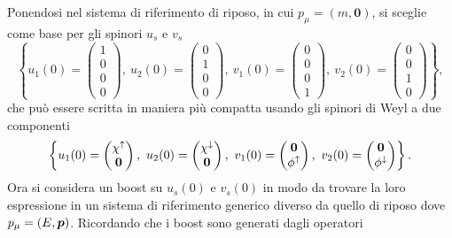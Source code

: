 Ponendosi nel sistema di riferimento di riposo, in cui $p_\mu = (m,\bm{0})$, si sceglie come base per gli spinori $u_s$ e $v_s$ 
\begin{equation}
    \left\{u_1(0) = 
    \begin{pmatrix}
        1 \\
        0 \\
        0 \\
        0
    \end{pmatrix},\
    u_2(0) = 
    \begin{pmatrix}
        0 \\
        1 \\
        0 \\
        0
    \end{pmatrix},\
    v_1(0) = 
    \begin{pmatrix}
        0 \\
        0 \\
        0 \\
        1
    \end{pmatrix},\
    v_2(0) = 
    \begin{pmatrix}
        0 \\
        0 \\
        1 \\
        0
    \end{pmatrix}\right\},
\end{equation}
che può essere scritta in maniera più compatta usando gli spinori di Weyl a due componenti
\begin{equation}
    \left\{u_1(0) = 
    \begin{pmatrix}
        \chi^\uparrow \\
        \bm{0}
    \end{pmatrix},\
    u_2(0) = 
    \begin{pmatrix}
        \chi^\downarrow \\
        \bm{0}
    \end{pmatrix},\
    v_1(0) = 
    \begin{pmatrix}
        \bm{0} \\
        \phi^\uparrow
    \end{pmatrix},\
    v_2(0) = 
    \begin{pmatrix}
        \bm{0} \\
        \phi^\downarrow
    \end{pmatrix}\right\}.
\end{equation}
Ora si considera un boost su $u_s(0)$ e $v_s(0)$ in modo da trovare la loro espressione in un sistema di riferimento generico diverso da quello di riposo dove $p_\mu = (E,\bm{p})$. Ricordando che i boost sono generati dagli operatori
